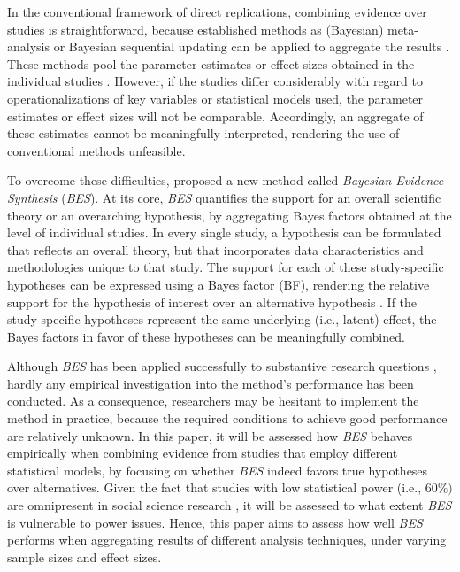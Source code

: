 \documentclass[]{interact}
\theoremstyle{plain}%
\theoremstyle{definition}
\theoremstyle{remark}
\begin{document}
In the conventional framework of direct replications, combining evidence
over studies is straightforward, because established methods as
(Bayesian) meta-analysis or Bayesian sequential updating can be applied
to aggregate the results
\citep{lipsey_wilson_2001, schonbrodt_sequential_2017, sutton_bayesian_meta2001}.
These methods pool the parameter estimates or effect sizes obtained in
the individual studies \citep{cooper_handbook_2009}. However, if the
studies differ considerably with regard to operationalizations of key
variables or statistical models used, the parameter estimates or effect
sizes will not be comparable. Accordingly, an aggregate of these
estimates cannot be meaningfully interpreted, rendering the use of
conventional methods unfeasible.

To overcome these difficulties, \citet{kuiper_combining_2013} proposed a
new method called \emph{Bayesian Evidence Synthesis} (\emph{BES}). At
its core, \emph{BES} quantifies the support for an overall scientific
theory or an overarching hypothesis, by aggregating Bayes factors
obtained at the level of individual studies. In every single study, a
hypothesis can be formulated that reflects an overall theory, but that
incorporates data characteristics and methodologies unique to that
study. The support for each of these study-specific hypotheses can be
expressed using a Bayes factor (BF), rendering the relative support for
the hypothesis of interest over an alternative hypothesis
\citep{kass_raftery_bayes_factors_1995}. If the study-specific
hypotheses represent the same underlying (i.e., latent) effect, the
Bayes factors in favor of these hypotheses can be meaningfully combined.

Although \emph{BES} has been applied successfully to substantive
research questions
\citep[e.g.,][]{kevenaar_bes_2021, zondervan_parental_2019, zondervan_robust_2020},
hardly any empirical investigation into the method's performance has
been conducted. As a consequence, researchers may be hesitant to
implement the method in practice, because the required conditions to
achieve good performance are relatively unknown. In this paper, it will
be assessed how \emph{BES} behaves empirically when combining evidence
from studies that employ different statistical models, by focusing on
whether \emph{BES} indeed favors true hypotheses over alternatives.
Given the fact that studies with low statistical power (i.e., \(60\%)\)
are omnipresent in social science research
\citep[e.g.,][]{ingre_power_2018, button2013power}, it will be assessed
to what extent \emph{BES} is vulnerable to power issues. Hence, this
paper aims to assess how well \emph{BES} performs when aggregating
results of different analysis techniques, under varying sample sizes and
effect sizes.
\end{document}
